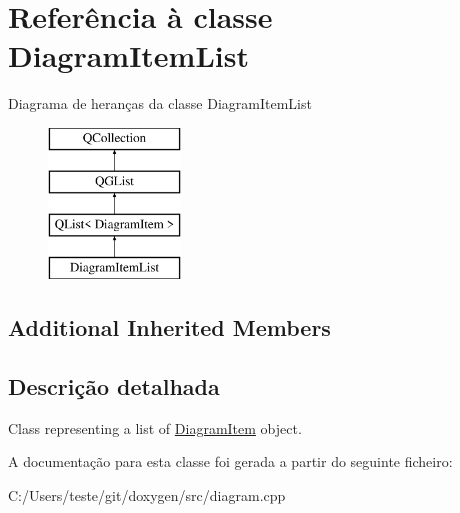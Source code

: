 \hypertarget{class_diagram_item_list}{\section{Referência à classe Diagram\-Item\-List}
\label{class_diagram_item_list}
}
Diagrama de heranças da classe Diagram\-Item\-List\begin{figure}[H]
\begin{center}
\leavevmode
\includegraphics[height=4.000000cm]{class_diagram_item_list}
\end{center}
\end{figure}
\subsection*{Additional Inherited Members}


\subsection{Descrição detalhada}
Class representing a list of \hyperlink{class_diagram_item}{Diagram\-Item} object. 

A documentação para esta classe foi gerada a partir do seguinte ficheiro\-:\begin{DoxyCompactItemize}
\item 
C\-:/\-Users/teste/git/doxygen/src/diagram.\-cpp\end{DoxyCompactItemize}
